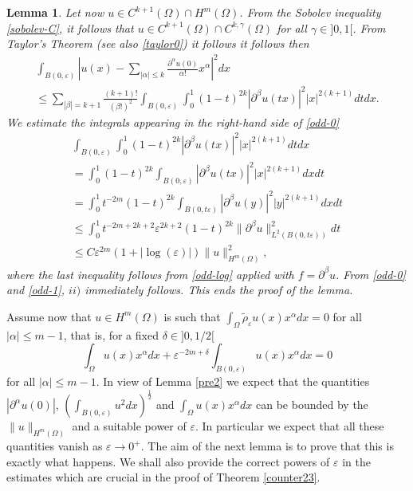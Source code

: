 \documentclass[11pt,a4paper]{amsart}
\numberwithin{equation}{section}
\newtheorem{lemma}[equation]{Lemma}
\begin{document}
\begin{lemma}
Let now $u\in C^{k+1}(\Omega)\cap H^m(\Omega)$. From the Sobolev inequality \eqref{sobolev-C}, it follows that $u\in C^{k+1}(\Omega)\cap C^{k,\gamma}(\Omega)$ for all $\gamma\in]0,1[$.
From Taylor's Theorem (see also \eqref{taylor0}) it follows it follows then
\begin{multline}\label{odd-0}
\int_{B(0,\varepsilon)}\left|u(x)-\sum_{|\alpha|\leq k}\frac{\partial^{\alpha} u(0)}{\alpha !}x^{\alpha}\right|^2dx\\
\leq\sum_{|\beta|=k+1}\frac{(k+1)!}{(\beta !)^2}\int_{B(0,\varepsilon)}\int_0^1(1-t)^{2k}|\partial^{\beta}u(tx)|^2|x|^{2(k+1)}dtdx. 
\end{multline}
We estimate the integrals appearing in the right-hand side of \eqref{odd-0}
\begin{multline}\label{odd-1}
\int_{B(0,\varepsilon)}\int_0^1(1-t)^{2k}|\partial^{\beta}u(tx)|^2|x|^{2(k+1)}dtdx\\
=\int_0^1(1-t)^{2k}\int_{B(0,\varepsilon)}|\partial^{\beta}u(tx)|^2|x|^{2(k+1)}dxdt\\
=\int_0^1t^{-2m}(1-t)^{2k}\int_{B(0,t\varepsilon)}|\partial^{\beta}u(y)|^2|y|^{2(k+1)}dxdt\\
\leq \int_0^1t^{-2m+2k+2}\varepsilon^{2k+2}(1-t)^{2k}\|\partial^{\beta}u\|_{L^2(B(0,t\varepsilon))}^2dt\\
\leq C\varepsilon^{2m}(1+|\log(\varepsilon)|)\|u\|_{H^m(\Omega)}^2,
\end{multline}
where the last inequality follows from \eqref{odd-log} applied with $f=\partial^{\beta}u$. From \eqref{odd-0} and \eqref{odd-1}, $ii)$ immediately follows. This ends the proof of the lemma. 
\endproof
\end{lemma}

Assume now that $u\in H^m(\Omega)$ is such that $\int_{\Omega}\tilde\rho_{\varepsilon}u(x)x^{\alpha}dx=0$ for all $|\alpha|\leq m-1$, that is, for a fixed $\delta\in]0,1/2[$
$$
\int_{\Omega}u(x)x^{\alpha}dx+\varepsilon^{-2m+\delta}\int_{B(0,\varepsilon)}u(x)x^{\alpha}dx=0
$$
for all $|\alpha|\leq m-1$. In view of Lemma \ref{pre2} we expect that the quantities $|\partial^{\alpha}u(0)|$, $\left(\int_{B(0,\varepsilon)}u^2dx\right)^{\frac{1}{2}}$ and $\int_{\Omega}u(x)x^{\alpha}dx$ can be bounded by the $\|u\|_{H^m(\Omega)}$ and a suitable power of $\varepsilon$. In particular we expect that all these quantities vanish as $\varepsilon\rightarrow 0^+$. The aim of the next lemma is to prove that this is exactly what happens. We shall also provide the correct powers of $\varepsilon$ in the estimates which are crucial in the proof of Theorem \ref{counter23}.
\end{document}

